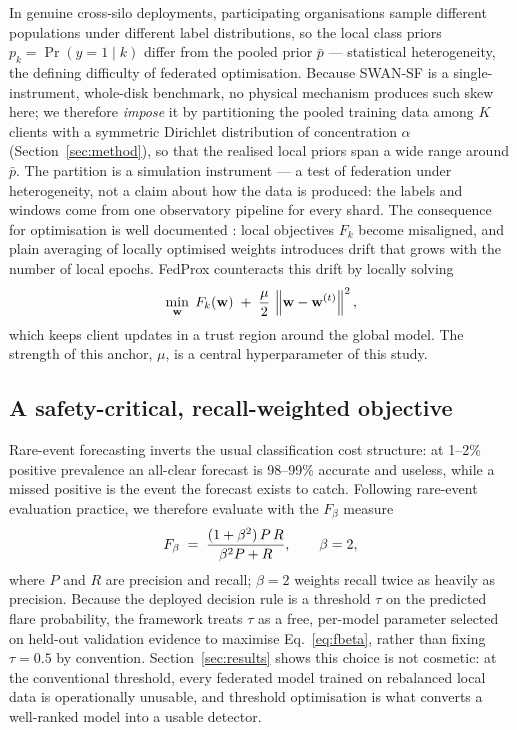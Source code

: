In genuine cross-silo deployments, participating organisations sample
different populations under different label distributions, so the
local class priors $p_k = \Pr(y=1 \mid k)$ differ from the pooled
prior $\bar{p}$ --- statistical heterogeneity, the defining
difficulty of federated optimisation. Because SWAN-SF is a
single-instrument, whole-disk benchmark, no physical mechanism
produces such skew here; we therefore \emph{impose} it by
partitioning the pooled training data among $K$ clients with a
symmetric Dirichlet distribution of concentration $\alpha$
(Section~\ref{sec:method}),
so that the realised local priors span a wide range around $\bar{p}$.
The partition is a simulation instrument --- a test of federation
under heterogeneity, not a claim about how the data is produced: the
labels and windows come from one observatory pipeline for every
shard. The consequence for optimisation is well documented
\cite{zhao2018,li2020}: local objectives $F_k$ become misaligned, and
plain averaging of locally optimised weights introduces drift that
grows with the number of local epochs. FedProx counteracts this drift
by locally solving
\begin{equation}\label{eq:fedprox}
    \min_{\mathbf{w}} \;
    F_k(\mathbf{w}) \;+\; \frac{\mu}{2}\,\left\lVert \mathbf{w} - \mathbf{w}^{(t)} \right\rVert^{2},
\end{equation}
which keeps client updates in a trust region around the global model.
The strength of this anchor, $\mu$, is a central hyperparameter of
this study.

\subsection{A safety-critical, recall-weighted objective}

Rare-event forecasting inverts the usual classification cost
structure: at 1--2\% positive prevalence an all-clear forecast is
98--99\% accurate and useless, while a missed positive is the event
the forecast exists to catch. Following rare-event evaluation
practice, we therefore evaluate with the $F_\beta$ measure
\begin{equation}\label{eq:fbeta}
    F_{\beta} \;=\;
    \frac{(1+\beta^{2})\, P\, R}{\beta^{2} P + R},
    \qquad \beta = 2,
\end{equation}
where $P$ and $R$ are precision and recall; $\beta = 2$ weights recall
twice as heavily as precision. Because the deployed decision rule is a
threshold $\tau$ on the predicted flare probability, the framework
treats $\tau$ as a free, per-model parameter selected on held-out
validation evidence to maximise Eq.~\eqref{eq:fbeta}, rather than
fixing $\tau = 0.5$ by convention. Section~\ref{sec:results} shows this
choice is not cosmetic: at the conventional threshold, every federated
model trained on rebalanced local data is operationally unusable, and
threshold optimisation is what converts a well-ranked model into a
usable detector.
